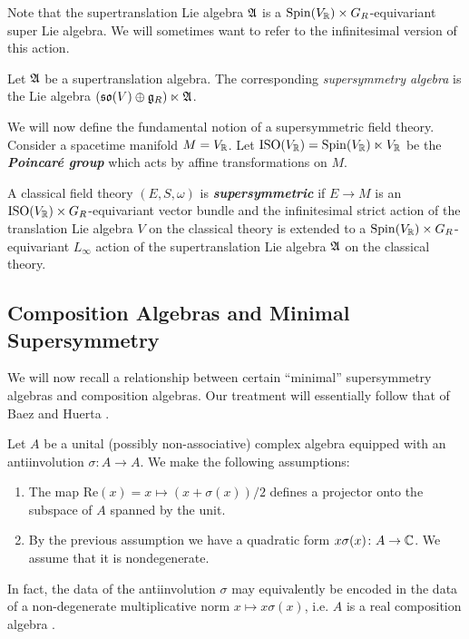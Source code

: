 \documentclass[10pt, oneside]{article}
\renewcommand{\Re}{\mathrm{Re}}
\newcommand{\defterm}[1]{\textbf{\emph{#1}}}
\begin{document}
Note that the supertranslation Lie algebra $\mathfrak A$ is a $\mathrm{Spin}(V_\mathbb R)\times G_R$-equivariant super Lie algebra.  We will sometimes want to refer to the infinitesimal version of this action.
\begin{definition}
Let $\mathfrak A$ be a supertranslation algebra.  The corresponding \emph{supersymmetry algebra} is the Lie algebra $(\mathfrak{so}(V) \oplus \mathfrak{g}_R) \ltimes \mathfrak A$.
\end{definition}

We will now define the fundamental notion of a supersymmetric field theory.  Consider a spacetime manifold $M=V_\mathbb R$. Let $\mathrm{ISO}(V_\mathbb R) = \mathrm{Spin}(V_\mathbb R)\ltimes V_\mathbb R$ be the \defterm{Poincar\'{e} group} which acts by affine transformations on $M$.

\begin{definition}
\label{dfn: super}
A classical field theory $(E, S, \omega)$ is \defterm{supersymmetric} if $E\rightarrow M$ is an $\mathrm{ISO}(V_\mathbb R)\times G_R$-equivariant vector bundle and the infinitesimal strict action of the translation Lie algebra $V$ on the classical theory is extended to a $\mathrm{Spin}(V_\mathbb R)\times G_R$-equivariant $L_\infty$ action of the supertranslation Lie algebra $\mathfrak A$ on the classical theory.
\end{definition}

\subsection{Composition Algebras and Minimal Supersymmetry}
\label{sect:compositionalgebras}

We will now recall a relationship between certain ``minimal'' supersymmetry algebras and composition algebras. Our treatment will essentially follow that of Baez and Huerta \cite{BaezHuerta}.

Let $A$ be a unital (possibly non-associative) complex algebra equipped with an antiinvolution $\sigma\colon A\rightarrow A$. We make the following assumptions:
\begin{enumerate}
\item The map $\Re(x)=x\mapsto (x + \sigma(x))/2$ defines a projector onto the subspace of $A$ spanned by the unit.

\item By the previous assumption we have a quadratic form $x\sigma(x)\colon A\rightarrow \mathbb C$. We assume that it is nondegenerate.
\end{enumerate}

In fact, the data of the antiinvolution $\sigma$ may equivalently be encoded in the data of a non-degenerate multiplicative norm $x\mapsto x\sigma(x)$, i.e. $A$ is a real composition algebra \cite[Chapter 1.3]{SpringerVeldkamp}.
\end{document}

